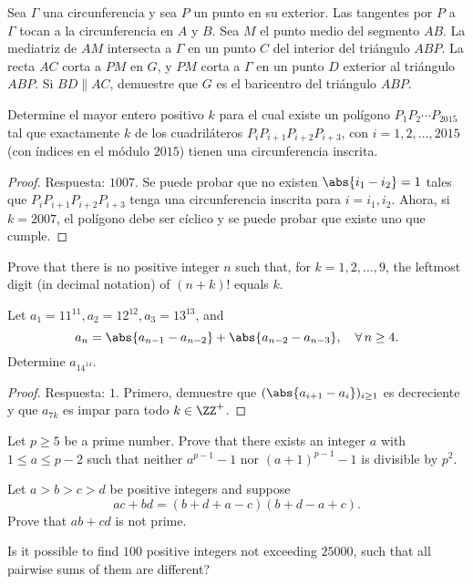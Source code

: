 \begin{probEG}
	Sea $\Gamma$ una circunferencia y sea $P$ un punto en su exterior. Las tangentes por $P$ a $\Gamma$ tocan a la circunferencia en $A$ y $B$. Sea $M$ el punto medio del segmento $AB$. La mediatriz de $AM$ intersecta a $\Gamma$ en un punto $C$ del interior del triángulo $ABP$. La recta $AC$ corta a $PM$ en $G$, y $PM$ corta a $\Gamma$ en un punto $D$ exterior al triángulo $ABP$. Si $BD\parallel AC$, demuestre que $G$ es el baricentro del triángulo $ABP$.
\end{probEG}

\begin{probEG}
	Determine el mayor entero positivo $k$ para el cual existe un polígono $P_1P_2\cdots P_{2015}$ tal que exactamente $k$ de los cuadriláteros $P_iP_{i+1}P_{i+2}P_{i+3}$, con $i=1,2,\dots,2015$ (con índices en el módulo $2015$) tienen una circunferencia inscrita.
\end{probEG}

\begin{proof}
	Respuesta: $1007$. Se puede probar que no existen $\abs{i_1-i_2}=1$ tales que $P_iP_{i+1}P_{i+2}P_{i+3}$ tenga una circunferencia inscrita para $i=i_1,i_2$. Ahora, si $k=2007$, el polígono debe ser cíclico y se puede probar que existe uno que cumple.
\end{proof}


\begin{probEG}[ISL 2001/N1]
	Prove that there is no positive integer $n$ such that, for $k=1,2,\dots,9$, the leftmost digit (in decimal notation) of $(n+k)!$ equals $k$.
\end{probEG}

\begin{probMR}[ISL 2001/N3]
	Let $a_1=11^{11},a_2=12^{12},a_3=13^{13}$, and
	\[a_n=\abs{a_{n-1}-a_{n-2}}+\abs{a_{n-2}-a_{n-3}},\quad\forall\,n\ge 4.\]
	Determine $a_{14^{14}}$.
\end{probMR}

\begin{proof}
	Respuesta: $1$. Primero, demuestre que $(\abs{a_{i+1}-a_i})_{i\ge 1}$ es decreciente y que $a_{7k}$ es impar para todo $k\in\ZZ^+$.
\end{proof}

\begin{problem}[ISL 2001/N4]
	Let $p\ge 5$ be a prime number. Prove that there exists an integer $a$ with $1\le a\le p-2$ such that neither $a^{p-1}-1$ nor $(a+1)^{p-1}-1$ is divisible by $p^2$.
\end{problem}

\begin{problem}[ISL 2001/N5]
	Let $a>b>c>d$ be positive integers and suppose
	\[ac+bd=(b+d+a-c)(b+d-a+c).\]
	Prove that $ab+cd$ is not prime.
\end{problem}

\begin{problem}[ISL 2001/N6]
	Is it possible to find $100$ positive integers not exceeding $25000$, such that all pairwise sums of them are different?
\end{problem}
